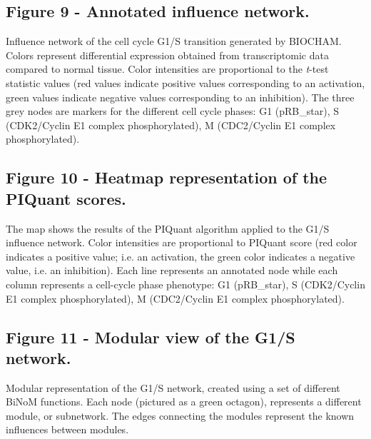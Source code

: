 \documentclass[10pt]{bmc_article}
\newenvironment{bmcformat}{\baselineskip20pt\sloppy\setboolean{publ}{false}}{\baselineskip20pt\sloppy}
\begin{document}
\begin{bmcformat}
  \subsection*{Figure 9 - Annotated influence network.}
Influence network of the cell cycle G1/S transition generated by BIOCHAM. Colors represent differential
expression obtained from transcriptomic data compared to normal tissue. Color
intensities are proportional to the \textit{t}-test statistic values (red values indicate
positive values corresponding to an activation, green values indicate negative
values corresponding to an inhibition). The three grey nodes are markers for the
different cell cycle phases: G1 (pRB\_star), S (CDK2/Cyclin E1 complex phosphorylated), M (CDC2/Cyclin E1 complex phosphorylated).

  \subsection*{Figure 10 - Heatmap representation of the PIQuant scores.}
The map shows the results of the PIQuant algorithm applied to the G1/S
influence network. Color intensities are proportional to PIQuant score (red color indicates a positive
value; i.e. an activation, the green color indicates a negative value, i.e. an
inhibition).
Each line represents an annotated node while each column represents a cell-cycle
phase phenotype: G1 (pRB\_star), S (CDK2/Cyclin E1 complex phosphorylated), M (CDC2/Cyclin E1 complex phosphorylated).

  \subsection*{Figure 11 - Modular view of the G1/S network.}
Modular representation of the G1/S network, created using a set of
different BiNoM functions. Each node (pictured as a green octagon), represents a
different module, or subnetwork. The edges connecting the modules represent the
 known influences between modules.




\end{bmcformat}
\end{document}
